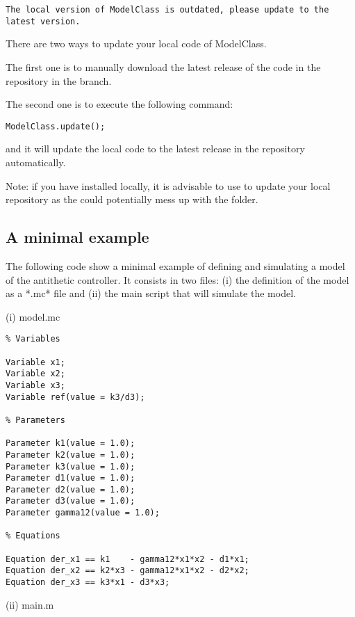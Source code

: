 \documentclass[11pt]{article}
\begin{document}
\begin{lstlisting}
The local version of ModelClass is outdated, please update to the latest version.
\end{lstlisting}

There are two ways to update your local code of ModelClass.

The first one is to manually download the latest release of the code in the repository in the  branch.

The second one is to execute the following command:

\begin{lstlisting}
ModelClass.update();
\end{lstlisting}

and it will update the local code to the latest release in the repository automatically. 

Note: if you have  installed locally, it is advisable to use  to update your local repository as the  could potentially mess up with the  folder.

\subsection{A minimal example}

The following code show a minimal example of defining and simulating a model of the antithetic controller. It consists in two files: (i) the definition of the model as a *.mc* file and (ii) the main script that will simulate the model. 

(i) model.mc 

\begin{lstlisting}
% Variables

Variable x1;
Variable x2;
Variable x3;
Variable ref(value = k3/d3);

% Parameters

Parameter k1(value = 1.0);
Parameter k2(value = 1.0);
Parameter k3(value = 1.0);
Parameter d1(value = 1.0);
Parameter d2(value = 1.0);
Parameter d3(value = 1.0);
Parameter gamma12(value = 1.0);

% Equations

Equation der_x1 == k1    - gamma12*x1*x2 - d1*x1;
Equation der_x2 == k2*x3 - gamma12*x1*x2 - d2*x2;
Equation der_x3 == k3*x1 - d3*x3;
\end{lstlisting}

(ii) main.m
\end{document}
